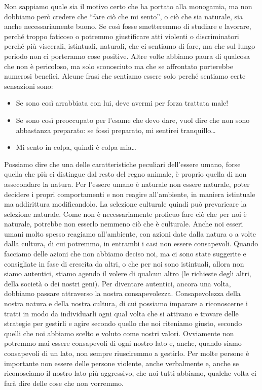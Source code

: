 \documentclass[12pt]{book} %
\begin{document}
Non sappiamo quale sia il motivo certo che ha portato alla monogamia, ma non dobbiamo però
credere che “fare ciò che mi sento”, o ciò che sia naturale, sia anche necessariamente buono. Se
così fosse smetteremmo di studiare e lavorare, perché troppo faticoso o potremmo giustificare atti violenti o
discriminatori perché più viscerali, istintuali, naturali, che ci sentiamo di fare,
ma che sul lungo periodo non ci porteranno cose positive. Altre volte abbiamo paura di qualcosa che non è
pericoloso, ma solo sconosciuto ma che se affrontato porterebbe numerosi benefici. 
Alcune frasi che sentiamo essere solo perché sentiamo certe sensazioni sono:
\begin{itemize}
\item Se sono così arrabbiata con lui, deve avermi per forza trattata male! 
\item Se sono così preoccupato per l'esame che devo dare, vuol dire che non sono abbastanza preparato: se fossi preparato, mi sentirei tranquillo…
\item Mi sento in colpa, quindi è colpa mia…
\end{itemize}

Possiamo dire che una delle caratteristiche peculiari dell'essere umano, forse quella che più ci
distingue dal resto del regno animale, è proprio quella di non assecondare la natura. Per l'essere
umano è naturale non essere naturale, poter decidere i propri comportamenti e non reagire
all'ambiente, in maniera istintuale ma addirittura modificandolo. La selezione culturale quindi
può prevaricare la selezione naturale. Come non è necessariamente proficuo fare ciò che per noi è naturale, potrebbe non esserlo
nemmeno ciò che è culturale. Anche noi esseri umani molto spesso reagiamo
all'ambiente, con azioni date dalla natura o a volte dalla cultura, di cui potremmo, in entrambi i
casi non essere consapevoli. Quando facciamo delle azioni che non abbiamo deciso noi, ma ci sono state suggerite e
consigliate in fase di crescita da altri, o che per noi sono istintuali, allora non siamo autentici, stiamo agendo il
volere di qualcun altro (le richieste degli altri, della società o dei nostri geni). Per diventare autentici, ancora
una volta, dobbiamo passare attraverso la nostra consapevolezza. Consapevolezza della nostra natura e della nostra
cultura, di cui possiamo imparare a riconoscerne i tratti
in modo da individuarli ogni qual volta che si attivano e trovare delle strategie per gestirli e agire secondo quello
che noi riteniamo giusto, secondo quelli che noi abbiamo scelto e voluto come nostri valori. Ovviamente non potremmo
mai essere consapevoli di ogni nostro lato e, anche, quando siamo consapevoli di un lato, non sempre riusciremmo a gestirlo. Per
molte persone è importante non essere delle persone violente, anche verbalmente e, anche se riconosciamo il nostro lato
più aggressivo, che noi tutti abbiamo, qualche volta ci farà dire delle cose che non vorremmo.
\end{document}
